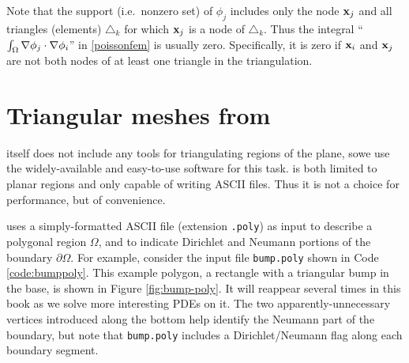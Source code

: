 Note that the support (i.e.~nonzero set) of $\phi_j$ includes only the node $\mathbf{x}_j$ and all triangles (elements) $\triangle_k$ for which $\mathbf{x}_j$ is a node of $\triangle_k$.  Thus the integral ``$\int_\Omega \nabla \phi_j \cdot \nabla \phi_i$'' in \eqref{poissonfem} is usually zero.  Specifically, it is zero if $\mathbf{x}_i$ and $\mathbf{x}_j$ are not both nodes of at least one triangle in the triangulation.


\section{Triangular meshes from \Triangle}

\PETSc itself does not include any tools for triangulating regions of the plane, sowe use the widely-available and easy-to-use \Triangle{} software \citep{Shewchuk1996} for this task.  \Triangle is both limited to planar regions and only capable of writing ASCII files.  Thus it is not a choice for performance, but of convenience.

\Triangle uses a simply-formatted ASCII file (extension \texttt{.poly}) as input to describe a polygonal region $\Omega$, and to indicate Dirichlet and Neumann portions of the boundary $\partial \Omega$.  For example, consider the input file \texttt{bump.poly} shown in Code \ref{code:bumppoly}.  This example polygon, a rectangle with a triangular bump in the base, is shown in Figure \ref{fig:bump-poly}.  It will reappear several times in this book as we solve more interesting PDEs on it.  The two apparently-unnecessary vertices introduced along the bottom help identify the Neumann part of the boundary, but note that \texttt{bump.poly} includes a Dirichlet/Neumann flag along each boundary segment.


